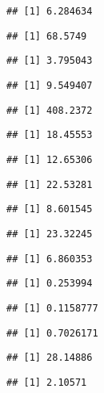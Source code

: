 \documentclass[
]{article}
\begin{document}
\begin{verbatim}
## [1] 6.284634
\end{verbatim}

\begin{verbatim}
## [1] 68.5749
\end{verbatim}

\begin{verbatim}
## [1] 3.795043
\end{verbatim}

\begin{verbatim}
## [1] 9.549407
\end{verbatim}

\begin{verbatim}
## [1] 408.2372
\end{verbatim}

\begin{verbatim}
## [1] 18.45553
\end{verbatim}

\begin{verbatim}
## [1] 12.65306
\end{verbatim}

\begin{verbatim}
## [1] 22.53281
\end{verbatim}

\begin{verbatim}
## [1] 8.601545
\end{verbatim}

\begin{verbatim}
## [1] 23.32245
\end{verbatim}

\begin{verbatim}
## [1] 6.860353
\end{verbatim}

\begin{verbatim}
## [1] 0.253994
\end{verbatim}

\begin{verbatim}
## [1] 0.1158777
\end{verbatim}

\begin{verbatim}
## [1] 0.7026171
\end{verbatim}

\begin{verbatim}
## [1] 28.14886
\end{verbatim}

\begin{verbatim}
## [1] 2.10571
\end{verbatim}
\end{document}
